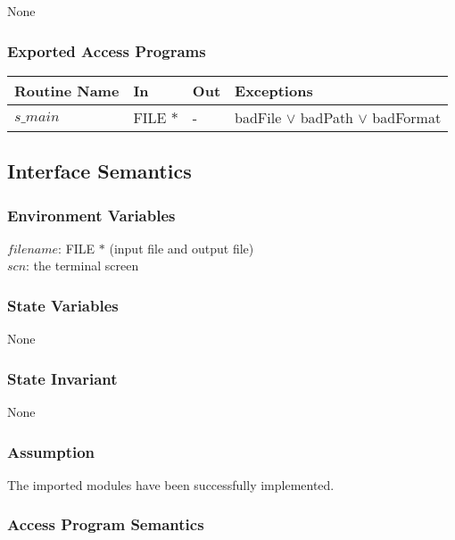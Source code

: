 \documentclass[12pt]{article}
\begin{document}
None

\subsubsection{Exported Access Programs}
\begin{center}
\begin{tabular}{l l l l} \hline 
\textbf{Routine Name} & \textbf{In} & \textbf{Out} & \textbf{Exceptions} \\ \hline 
$s\_main$ & FILE $\ast$ & - & badFile $\vee$ badPath $\vee$ badFormat \\ \hline
\end{tabular}
\end{center}

\subsection{Interface Semantics}

\subsubsection{Environment Variables}

$filename$: FILE $\ast$ (input file and output file) \\
$scn$: the terminal screen

\subsubsection{State Variables}

None 

\subsubsection{State Invariant}

None

\subsubsection{Assumption}

The imported modules have been successfully implemented.

\subsubsection{Access Program Semantics}
\end{document}
